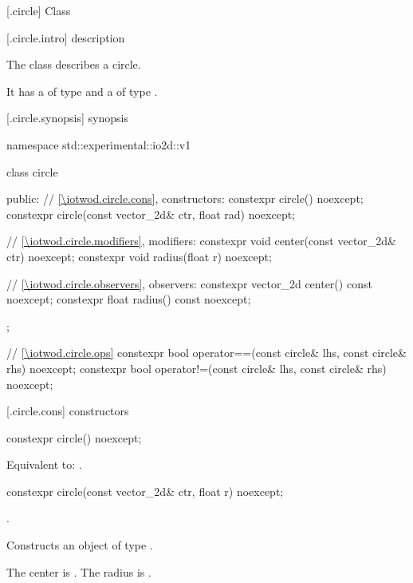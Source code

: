  [\iotwod.circle] {Class }

 [\iotwod.circle.intro] { description}

\pnum
{}%
The class  describes a circle.

\pnum
It has a  of type  and a  of type .

 [\iotwod.circle.synopsis] { synopsis}

\begin{codeblock}
namespace std::experimental::io2d::v1 {
  class circle {
  public:
    // \ref{\iotwod.circle.cons}, constructors:
    constexpr circle() noexcept;
    constexpr circle(const vector_2d& ctr, float rad) noexcept;

    // \ref{\iotwod.circle.modifiers}, modifiers:
    constexpr void center(const vector_2d& ctr) noexcept;
    constexpr void radius(float r) noexcept;
    
    // \ref{\iotwod.circle.observers}, observers:
    constexpr vector_2d center() const noexcept;
    constexpr float radius() const noexcept;
  };

  // \ref{\iotwod.circle.ops}  
  constexpr bool operator==(const circle& lhs, const circle& rhs) noexcept;
  constexpr bool operator!=(const circle& lhs, const circle& rhs) noexcept;
}
\end{codeblock}

 [\iotwod.circle.cons] { constructors}

%
\begin{itemdecl}
constexpr circle() noexcept;
\end{itemdecl}
\begin{itemdescr}
\pnum
\effects
Equivalent to: .
\end{itemdescr}

%
\begin{itemdecl}
constexpr circle(const vector_2d& ctr, float r) noexcept;
\end{itemdecl}
\begin{itemdescr}
\requires
{}.

\pnum
\effects
Constructs an object of type .

\pnum
The center is . The radius is .
\end{itemdescr}

